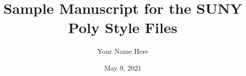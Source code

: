 \documentclass[letterpaper,11pt]{report}
\title{Sample Manuscript for the SUNY Poly Style Files}
\author{Your Name Here}
\date{May 9, 2021} %
\begin{document}
%

\begin{romanpages}      %
\ApprovalPage   %
\TitlePage 
\CopyrightPage  %

%
%


%
%


%
%


\StylePage
\tableofcontents

%
\listoffigures
\listoftables

\end{romanpages}        %


\normalem       %



\end{document}
